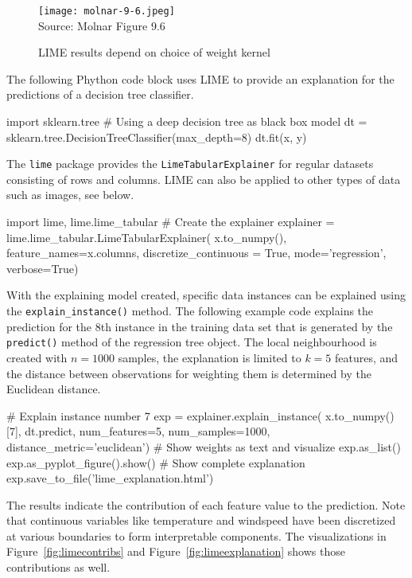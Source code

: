 \begin{figure}
\centering

\texttt{[image: molnar-9-6.jpeg]} \\

\scriptsize Source: Molnar Figure 9.6
\caption{LIME results depend on choice of weight kernel}
\label{fig:molnar96}
\end{figure}

The following Phython code block uses LIME to provide an explanation for the predictions of a decision tree classifier. 

\begin{pythoncode}
import sklearn.tree
# Using a deep decision tree as black box model
dt = sklearn.tree.DecisionTreeClassifier(max_depth=8)
dt.fit(x, y)
\end{pythoncode}

The \texttt{lime} package provides the \texttt{LimeTabularExplainer} for regular datasets consisting of rows and columns. LIME can also be applied to other types of data such as images, see below.

\begin{pythoncode}
import lime, lime.lime_tabular
# Create the explainer
explainer = lime.lime_tabular.LimeTabularExplainer(
    x.to_numpy(), 
    feature_names=x.columns, 
    discretize_continuous = True, 
    mode='regression', 
    verbose=True)
\end{pythoncode}

With the explaining model created, specific data instances can be explained using the \texttt{explain\_instance()} method. The following example code explains the prediction for the 8th instance in the training data set that is generated by the \texttt{predict()} method of the regression tree object. The local neighbourhood is created with $n=1000$ samples, the explanation is limited to $k=5$ features, and the distance between observations for weighting them is determined by the Euclidean distance.

\begin{pythoncode}
# Explain instance number 7
exp = explainer.explain_instance( 
    x.to_numpy()[7], 
    dt.predict, 
    num_features=5, 
    num_samples=1000, 
    distance_metric='euclidean')
# Show weights as text and visualize
exp.as_list()
exp.as_pyplot_figure().show()
# Show complete explanation
exp.save_to_file('lime_explanation.html')
\end{pythoncode}

The results indicate the contribution of each feature value to the prediction. Note that continuous variables like temperature and windspeed have been discretized at various boundaries to form interpretable components. The visualizations in Figure~\ref{fig:limecontribs} and Figure~\ref{fig:limeexplanation} shows those contributions as well. 

